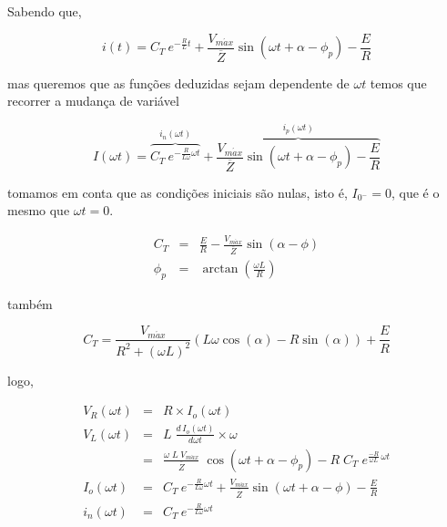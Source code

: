 \documentclass[titlepage, a4paper, 11pt, reqno, openany]{report}
\begin{document}
\begin{enumerate}
\begin{enumerate}
\begin{equation}
\end{equation}\par
%
Sabendo que,\par
\begin{equation}
i(t)=C_T\ e^{-\frac{R}{L}t}+\frac{V_{m\acute{a}x}}{\overline{Z}}\sin(\omega t + \alpha - \phi_p)-\frac{E}{R}
\end{equation}\par
%
mas queremos que as fun\c{c}\~{o}es  deduzidas sejam dependente de {\color{red}$\omega t$} temos que recorrer a mudan\c{c}a de vari\'{a}vel \par
%
\begin{equation}
I(\omega t)= \overbrace{C_T\ e^{-\frac{R}{L \omega}\omega t}}^{i_n(\omega t)} + \overbrace{\frac{V_{m\acute{a}x}}{\overline{Z}}\sin(\omega t + \alpha - \phi_p)-\frac{E}{R}}^{i_p(\omega t)}
\end{equation}\par
tomamos em conta que as condi\c{c}\~{o}es iniciais s\~{a}o nulas, isto \'{e}, $I_{0^-}=0$, que \'{e} o mesmo que $\omega t = 0$.\par
%
\begin{eqnarray}
C_T &=& \frac{E}{R}-\frac{V_{m\acute{a}x}}{\overline{Z}}\sin(\alpha - \phi) \\
\phi_p &=& \arctan \left( \frac{\omega L}{R} \right)
\end{eqnarray}\par
%
tamb\'{e}m\par
%
\begin{equation}
C_T = \frac{V_{m\acute{a}x}}{R^2 + (\omega L)^2}(L \omega \cos(\alpha) - R \sin (\alpha))+\frac{E}{R}
\end{equation}\par
%
logo,\par
\begin{eqnarray}
V_R(\omega t) &=& R \times I_o(\omega t)\\
V_L(\omega t) &=& L \; \frac{d\, I_o(\omega t)}{d\omega t} \times \omega \\
 &=& \frac{\omega \; L \; V_{m\acute{a}x}}{\overline{Z}} \; \cos(\omega t + \alpha - \phi_p) - R \; C_T \; e^{\frac{-R}{\omega L} \, \omega t} \nonumber \\
I_o(\omega t) &=& C_T\ e^{-\frac{R}{L \omega}\omega t}+\frac{V_{m\acute{a}x}}{\overline{Z}}\sin(\omega t + \alpha - \phi)-\frac{E}{R}\\
i_n(\omega t) &=& C_T\ e^{-\frac{R}{L \omega}\omega t}\\

\end{eqnarray}
\end{enumerate}
\end{enumerate}
\end{document}

